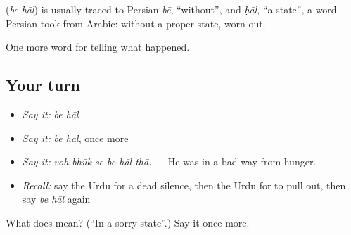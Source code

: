 \begin{cousinweb}
\textbf{ } (\emph{be hāl}) is usually traced to Persian \emph{bē}, \textquotedblleft{}without\textquotedblright{}, and \emph{ḥāl}, \textquotedblleft{}a state\textquotedblright{}, a word Persian took from Arabic: without a proper state, worn out.
\end{cousinweb}

\begin{grammarlens}[title={What you've built}]
One more word for telling what happened.
\end{grammarlens}

\subsection*{Your turn}
\begin{itemize}
\raggedright
  \item \emph{Say it:} \emph{be hāl}
  \item \emph{Say it:} \emph{be hāl}, once more
  \item \emph{Say it:} \emph{voh bhūk se be hāl thā.} — He was in a bad way from hunger.
  \item \emph{Recall:} say the Urdu for a dead silence, then the Urdu for to pull out, then say \emph{be hāl} again
\end{itemize}

\begin{tcolorbox}[breakable,colback=teal!4,colframe=teal!35!black,title={Before you move on}]
What does   mean? (\textquotedblleft{}In a sorry state\textquotedblright{}.) Say it once more.
\end{tcolorbox}
